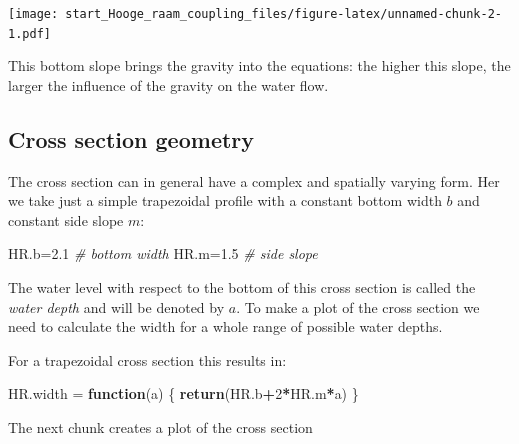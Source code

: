 \documentclass[
]{article}
\newenvironment{Shaded}{\begin{snugshade}}{\end{snugshade}}
\newcommand{\CommentTok}[1]{\textcolor[rgb]{0.56,0.35,0.01}{\textit{#1}}}
\newcommand{\ControlFlowTok}[1]{\textcolor[rgb]{0.13,0.29,0.53}{\textbf{#1}}}
\newcommand{\DecValTok}[1]{\textcolor[rgb]{0.00,0.00,0.81}{#1}}
\newcommand{\FloatTok}[1]{\textcolor[rgb]{0.00,0.00,0.81}{#1}}
\newcommand{\FunctionTok}[1]{\textcolor[rgb]{0.13,0.29,0.53}{\textbf{#1}}}
\newcommand{\NormalTok}[1]{#1}
\newcommand{\OtherTok}[1]{\textcolor[rgb]{0.56,0.35,0.01}{#1}}
\newcommand{\SpecialCharTok}[1]{\textcolor[rgb]{0.81,0.36,0.00}{\textbf{#1}}}
\begin{document}
\texttt{[image: start\_Hooge\_raam\_coupling\_files/figure-latex/unnamed-chunk-2-1.pdf]}

This bottom slope brings the gravity into the equations: the higher this
slope, the larger the influence of the gravity on the water flow.

\hypertarget{cross-section-geometry}{%
\subsection{Cross section geometry}\label{cross-section-geometry}}

The cross section can in general have a complex and spatially varying
form. Her we take just a simple trapezoidal profile with a constant
bottom width \(b\) and constant side slope \(m\):

\begin{Shaded}
\begin{Highlighting}[]
\NormalTok{HR.b}\OtherTok{=}\FloatTok{2.1}   \CommentTok{\# bottom  width}
\NormalTok{HR.m}\OtherTok{=}\FloatTok{1.5}   \CommentTok{\# side slope}
\end{Highlighting}
\end{Shaded}

The water level with respect to the bottom of this cross section is
called the \emph{water depth} and will be denoted by \(a\). To make a
plot of the cross section we need to calculate the width for a whole
range of possible water depths.

For a trapezoidal cross section this results in:

\begin{Shaded}
\begin{Highlighting}[]
\NormalTok{HR.width }\OtherTok{=} \ControlFlowTok{function}\NormalTok{(a)}
\NormalTok{\{}
  \FunctionTok{return}\NormalTok{(HR.b}\SpecialCharTok{+}\DecValTok{2}\SpecialCharTok{*}\NormalTok{HR.m}\SpecialCharTok{*}\NormalTok{a)}
\NormalTok{\}}
\end{Highlighting}
\end{Shaded}

The next chunk creates a plot of the cross section
\end{document}
